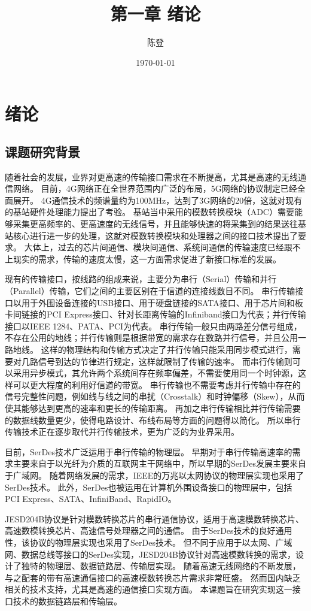 \documentclass[UTF8]{ctexart}
\title{第一章 绪论}
\author{陈登}
\date{\today}
\begin{document}
\section{绪论}

\subsection{课题研究背景}

随着社会的发展，业界对更高速的传输接口需求在不断提高，尤其是高速的无线通信网络。
目前，4G网络正在全世界范围内广泛的布局，5G网络的协议制定已经全面展开。
4G通信技术的频谱量约为100MHz，达到了3G网络的20倍\cite{zhangxw2013}，这就对现有的基站硬件处理能力提出了考验。
基站当中采用的模数转换模块（ADC）需要能够采集更高频率的、更高速度的无线信号，并且能够快速的将采集到的结果送往基站核心进行进一步的处理，这就对模数转换模块和处理器之间的接口技术提出了要求。
大体上，过去的芯片间通信、模块间通信、系统间通信的传输速度已经跟不上现实的需求，传输的速度太慢，这一方面需求促进了新接口标准的发展。

现有的传输接口，按线路的组成来说，主要分为串行（Serial）传输和并行（Parallel）传输，它们之间的主要区别在于信道的连接线数目不同。
串行传输接口以用于外围设备连接的USB接口、用于硬盘链接的SATA接口、用于芯片间和板卡间链接的PCI Express接口、针对长距离传输的Infiniband接口为代表；并行传输接口以IEEE 1284、PATA、PCI为代表。
串行传输一般只由两路差分信号组成，不存在公用的地线；并行传输则是根据带宽的需求存在数路并行信号，并且公用一路地线。
这样的物理结构和传输方式决定了并行传输只能采用同步模式进行，需要对几路信号到达的节律进行规定，这样就限制了传输的速率。
而串行传输则可以采用异步模式，其允许两个系统间存在频率偏差，不需要使用同一个时钟源，这样可以更大程度的利用好信道的带宽。
串行传输也不需要考虑并行传输中存在的信号完整性问题，例如线与线之间的串扰（Crosstalk）和时钟偏移（Skew），从而使其能够达到更高的速率和更长的传输距离。
再加之串行传输相比并行传输需要的数据线数量更少，使得电路设计、布线布局等方面的问题得以简化。
所以串行传输技术正在逐步取代并行传输技术，更为广泛的为业界采用。

目前，SerDes技术广泛运用于串行传输的物理层。
早期对于串行传输高速率的需求主要来自于以光纤为介质的互联网主干网络中，所以早期的SerDes发展主要来自于广域网。
随着网络发展的需求，IEEE的万兆以太网协议的物理层实现也采用了SerDes技术。
此外，SerDes也被运用在计算机外围设备接口的物理层中，包括PCI Express、SATA、InfiniBand、RapidIO。

JESD204B协议是针对模数转换芯片的串行通信协议，适用于高速模数转换芯片、高速数模转换芯片、高速信号处理器之间的通信。
由于SerDes技术的良好通用性，该协议的物理层实现也采用了SerDes技术。
但不同于应用于以太网、广域网、数据总线等接口的SerDes实现，JESD204B协议针对高速模数转换的需求，设计了独特的物理层、数据链路层、传输层实现。
随着高速无线网络的不断发展，与之配套的带有高速通信接口的高速模数转换芯片需求非常旺盛。
然而国内缺乏相关的技术支持，尤其是高速的通信接口实现方面。
本课题旨在研究实现这一接口技术的数据链路层和传输层。
\end{document}
